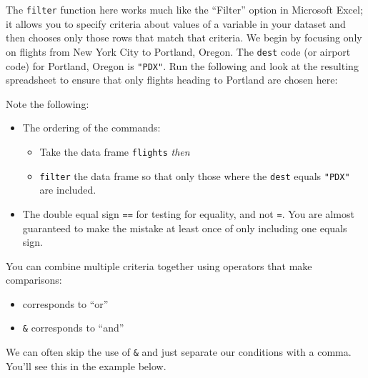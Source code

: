 \documentclass[12pt,]{krantz}
\makeatletter
\newenvironment{Shaded}{\begin{snugshade}}{\end{snugshade}}
\newcommand{\KeywordTok}[1]{\textcolor[rgb]{0.27,0.27,0.27}{\textbf{#1}}}
\newcommand{\StringTok}[1]{\textcolor[rgb]{0.5,0.5,0.5}{#1}}
\newcommand{\OperatorTok}[1]{\textcolor[rgb]{0.43,0.43,0.43}{\textbf{#1}}}
\newcommand{\NormalTok}[1]{#1}
\providecommand{\tightlist}{%
  \setlength{\itemsep}{0pt}\setlength{\parskip}{0pt}}
\newenvironment{kframe}{%
\medskip{}
\setlength{\fboxsep}{.8em}
 \def\at@end@of@kframe{}%
 \ifinner\ifhmode%
  \def\at@end@of@kframe{\end{minipage}}%
  \begin{minipage}{\columnwidth}%
 \fi\fi%
 \def\FrameCommand##1{\hskip\@totalleftmargin \hskip-\fboxsep
 \colorbox{shadecolor}{##1}\hskip-\fboxsep
     \hskip-\linewidth \hskip-\@totalleftmargin \hskip\columnwidth}%
 \MakeFramed {\advance\hsize-\width
   \@totalleftmargin\z@ \linewidth\hsize
   \@setminipage}}%
 {\par\unskip\endMakeFramed%
 \at@end@of@kframe}
\renewenvironment{Shaded}{\begin{kframe}}{\end{kframe}}
\theoremstyle{definition}
\theoremstyle{definition}
\theoremstyle{definition}
\theoremstyle{remark}
\makeatother
\begin{document}
The \texttt{filter} function here works much like the ``Filter'' option
in Microsoft Excel; it allows you to specify criteria about values of a
variable in your dataset and then chooses only those rows that match
that criteria. We begin by focusing only on flights from New York City
to Portland, Oregon. The \texttt{dest} code (or airport code) for
Portland, Oregon is \texttt{"PDX"}. Run the following and look at the
resulting spreadsheet to ensure that only flights heading to Portland
are chosen here:

\begin{Shaded}
\end{Shaded}

Note the following:

\begin{itemize}
\tightlist
\item
  The ordering of the commands:

  \begin{itemize}
  \tightlist
  \item
    Take the data frame \texttt{flights} \emph{then}
  \item
    \texttt{filter} the data frame so that only those where the
    \texttt{dest} equals \texttt{"PDX"} are included.
  \end{itemize}
\item
  The double equal sign \texttt{==} for testing for equality, and not
  \texttt{=}. You are almost guaranteed to make the mistake at least
  once of only including one equals sign.
\end{itemize}

You can combine multiple criteria together using operators that make
comparisons:

\begin{itemize}
\tightlist
\item
  \texttt{\textbar{}} corresponds to ``or''
\item
  \texttt{\&} corresponds to ``and''
\end{itemize}

We can often skip the use of \texttt{\&} and just separate our
conditions with a comma. You'll see this in the example below.
\end{document}
